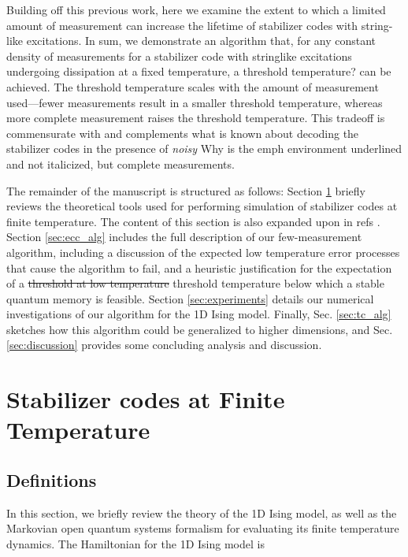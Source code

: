 \documentclass[twocolumn,superscriptaddress,aps,prb,floatfix]{revtex4-1}
\newcommand{\MS}[1]{{\color{mauve} {#1}}}
\begin{document}
 Building off this previous work, here we examine the extent to which a limited amount of measurement can increase the lifetime of stabilizer codes with string-like excitations.  In sum, we demonstrate an algorithm that, for any constant density of measurements for a stabilizer code with stringlike excitations undergoing dissipation at a fixed temperature, a threshold \MS{temperature?} can be achieved.  The threshold temperature scales with the amount of measurement used---fewer measurements result in a smaller threshold temperature, whereas more complete measurement raises the threshold temperature.  This tradeoff is commensurate with and complements what is known about decoding the stabilizer codes in the presence of \emph{noisy} \MS{Why is the emph environment underlined and not italicized}, but complete measurements\cite{Nickerson2016}.
 
 The remainder of the manuscript is structured as follows:  Section \ref{sec:stabfintemp} briefly reviews the theoretical tools used for performing simulation of stabilizer codes at finite temperature.  The content of this section is also expanded upon in refs \cite{Freeman2014,Freeman2016}.  Section \ref{sec:ecc_alg} includes the full description of our few-measurement algorithm, including a discussion of the expected low temperature error processes that cause the algorithm to fail, and a heuristic justification for the expectation of a \MS{\sout{threshold at low temperature} threshold temperature below which a stable quantum memory is feasible}.  Section \ref{sec:experiments} details our numerical investigations of our algorithm for the 1D Ising model.  Finally, Sec. \ref{sec:tc_alg} sketches how this algorithm could be generalized to higher dimensions, and Sec. \ref{sec:discussion} provides some concluding analysis and discussion.

\section{Stabilizer codes at Finite Temperature}
\label{sec:stabfintemp}

\subsection{Definitions}
\label{sec:Defs}
In this section, we briefly review the theory of the 1D Ising model, as well as the Markovian open quantum systems formalism for evaluating its finite temperature dynamics.  The Hamiltonian for the 1D Ising model is
\end{document}
